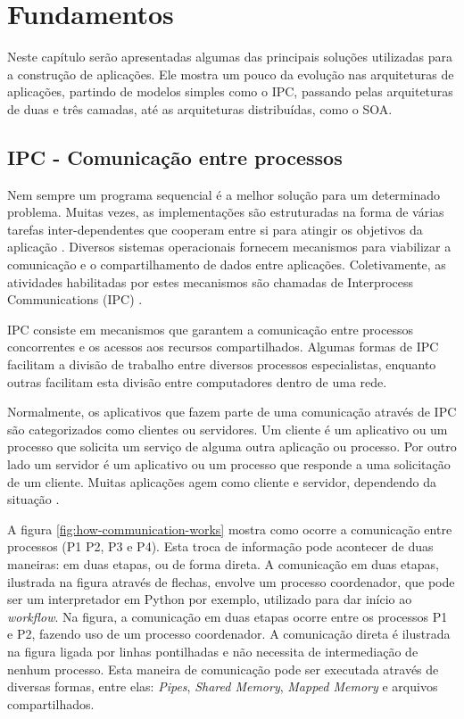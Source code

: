 \chapter[Fundamentos]{Fundamentos}

Neste capítulo serão apresentadas algumas das principais soluções utilizadas para a construção de aplicações. Ele mostra um pouco da evolução nas arquiteturas de aplicações, partindo de modelos simples como o IPC, passando pelas arquiteturas de duas e três camadas, até as arquiteturas distribuídas, como o SOA. 


\section{IPC - Comunicação entre processos}\label{sec:ipc}

Nem sempre um programa sequencial é a melhor solução para um determinado problema. Muitas vezes, as implementações são estruturadas na forma de várias tarefas inter-dependentes que cooperam entre si para atingir os objetivos da aplicação \cite{sistemas-op-mazierro}. Diversos sistemas operacionais fornecem mecanismos para viabilizar a comunicação e o compartilhamento de dados entre aplicações. Coletivamente, as atividades habilitadas por estes mecanismos são chamadas de Interprocess Communications (IPC) \cite{microsoft-ipc}.

IPC consiste em mecanismos que garantem a comunicação entre processos concorrentes e os acessos aos recursos compartilhados. Algumas formas de IPC facilitam a divisão de trabalho entre diversos processos especialistas, enquanto outras facilitam esta divisão entre computadores dentro de uma rede.

Normalmente, os aplicativos que fazem parte de uma comunicação através de IPC são categorizados como clientes ou servidores. Um cliente é um aplicativo ou um processo que solicita um serviço de alguma outra aplicação ou processo. Por outro lado um servidor é um aplicativo ou um processo que responde a uma solicitação de um cliente. Muitas aplicações agem como cliente e servidor, dependendo da situação \cite{microsoft-ipc}.

A figura \ref{fig:how-communication-works} mostra como ocorre a comunicação entre processos (P1 P2, P3 e P4). Esta troca de informação pode acontecer de duas maneiras: em duas etapas, ou de forma direta. A comunicação em duas etapas, ilustrada na figura através de flechas, envolve um processo coordenador, que pode ser um interpretador em Python por exemplo, utilizado para dar início ao \textit{workflow}. Na figura, a comunicação em duas etapas ocorre entre os processos P1 e P2, fazendo uso de um processo coordenador. A comunicação direta é ilustrada na figura ligada por linhas pontilhadas e não necessita de intermediação de nenhum processo. Esta maneira de comunicação pode ser executada através de diversas formas, entre elas: \textit{Pipes}, \textit{Shared Memory}, \textit{Mapped Memory} e arquivos compartilhados.


